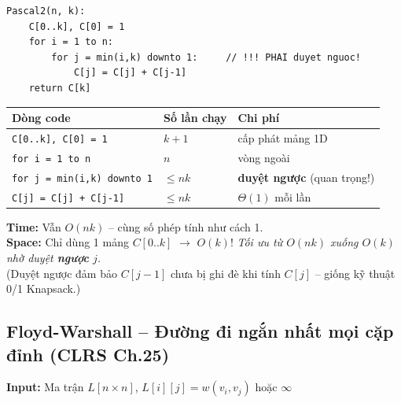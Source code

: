 \documentclass[10pt]{article}
\begin{document}
\begin{tcolorbox}[colback=gray!8, colframe=gray!50, boxrule=0.5pt, arc=2pt,
  left=6pt, right=6pt, top=4pt, bottom=4pt,
  title={\small\textbf{Pseudocode 18: Pascal Triangle -- DP tối ưu (O(k) space)}}]
\begin{verbatim}
Pascal2(n, k):
    C[0..k], C[0] = 1
    for i = 1 to n:
        for j = min(i,k) downto 1:     // !!! PHAI duyet nguoc!
            C[j] = C[j] + C[j-1]
    return C[k]
\end{verbatim}
\end{tcolorbox}

\begin{tcolorbox}[colback=yellow!5, colframe=orange!50, boxrule=0.5pt, arc=2pt, title={\small\textbf{Phân tích Complexity -- Pascal Triangle DP tối ưu ($O(k)$ space)}}]
\begin{tabular}{|l|l|l|}
\hline
\textbf{Dòng code} & \textbf{Số lần chạy} & \textbf{Chi phí} \\
\hline
\texttt{C[0..k], C[0] = 1} & $k+1$ & cấp phát mảng 1D \\
\hline
\texttt{for i = 1 to n} & $n$ & vòng ngoài \\
\hline
\quad \texttt{for j = min(i,k) downto 1} & $\leq nk$ & \textbf{duyệt ngược} (quan trọng!) \\
\hline
\quad\quad \texttt{C[j] = C[j] + C[j-1]} & $\leq nk$ & $\Theta(1)$ mỗi lần \\
\hline
\end{tabular}
\vspace{0.2cm}

\textbf{Time:} Vẫn $O(nk)$ -- cùng số phép tính như cách 1.\\
\textbf{Space:} Chỉ dùng 1 mảng $C[0..k]$ $\to$ $O(k)$! \textit{Tối ưu từ $O(nk)$ xuống $O(k)$ nhờ duyệt \textbf{ngược} $j$.}\\
{\small (Duyệt ngược đảm bảo $C[j-1]$ chưa bị ghi đè khi tính $C[j]$ -- giống kỹ thuật 0/1 Knapsack.)}
\end{tcolorbox}

\subsection{Floyd-Warshall -- Đường đi ngắn nhất mọi cặp đỉnh (CLRS
Ch.25)}\label{floyd-warshall-ux111ux1b0ux1eddng-ux111i-ngux1eafn-nhux1ea5t-mux1ecdi-cux1eb7p-ux111ux1ec9nh-clrs-ch.25}

\textbf{Input:} Ma trận \(L[n \times n]\), \(L[i][j] = w(v_i, v_j)\)
hoặc \(\infty\)
\end{document}
